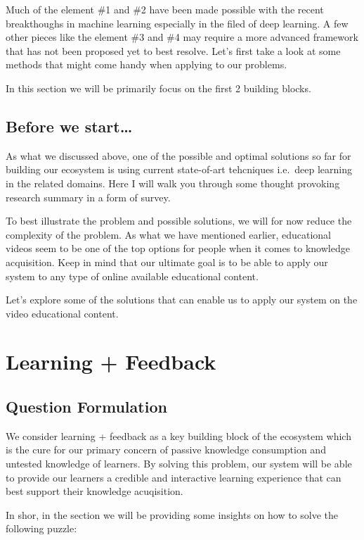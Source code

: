 \documentclass[]{book}
\theoremstyle{definition}
\theoremstyle{definition}
\theoremstyle{definition}
\theoremstyle{remark}
\begin{document}
Much of the element \#1 and \#2 have been made possible with the recent
breakthoughs in machine learning especially in the filed of deep
learning. A few other pieces like the element \#3 and \#4 may require a
more advanced framework that has not been proposed yet to best resolve.
Let's first take a look at some methods that might come handy when
applying to our problems.

In this section we will be primarily focus on the first 2 building
blocks.

\subsection{Before we start\ldots{}}\label{before-we-start}

As what we discussed above, one of the possible and optimal solutions so
far for building our ecosystem is using current state-of-art tehcniques
i.e.~deep learning in the related domains. Here I will walk you through
some thought provoking research summary in a form of survey.

To best illustrate the problem and possible solutions, we will for now
reduce the complexity of the problem. As what we have mentioned earlier,
educational videos seem to be one of the top options for people when it
comes to knowledge acquisition. Keep in mind that our ultimate goal is
to be able to apply our system to any type of online available
educational content.

Let's explore some of the solutions that can enable us to apply our
system on the video educational content.

\section{Learning + Feedback}\label{learning-feedback}

\subsection{Question Formulation}\label{question-formulation}

We consider learning + feedback as a key building block of the ecosystem
which is the cure for our primary concern of passive knowledge
consumption and untested knowledge of learners. By solving this problem,
our system will be able to provide our learners a credible and
interactive learning experience that can best support their knowledge
acuqisition.

In shor, in the section we will be providing some insights on how to
solve the following puzzle:
\end{document}
